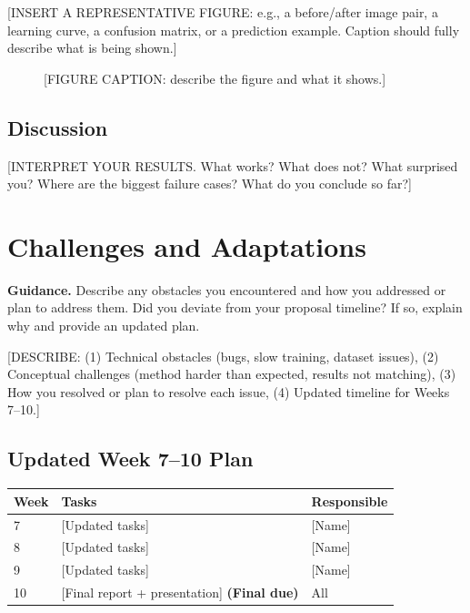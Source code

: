 \documentclass[11pt, letterpaper]{article}
\begin{document}
[INSERT A REPRESENTATIVE FIGURE: e.g., a before/after image pair, a learning
curve, a confusion matrix, or a prediction example. Caption should fully
describe what is being shown.]

\begin{figure}[h]
  \centering
  \caption{[FIGURE CAPTION: describe the figure and what it shows.]}
  \label{fig:qual}
\end{figure}

\subsection{Discussion}

[INTERPRET YOUR RESULTS. What works? What does not? What surprised you?
Where are the biggest failure cases? What do you conclude so far?]

\section{Challenges and Adaptations}

\begin{guidancebox}
\textbf{Guidance.} Describe any obstacles you encountered and how you
addressed or plan to address them. Did you deviate from your proposal timeline?
If so, explain why and provide an updated plan.
\end{guidancebox}

[DESCRIBE: (1) Technical obstacles (bugs, slow training, dataset issues),
(2) Conceptual challenges (method harder than expected, results not matching),
(3) How you resolved or plan to resolve each issue,
(4) Updated timeline for Weeks 7--10.]

\subsection{Updated Week 7--10 Plan}

\begin{tabular}{lp{8cm}l}
\toprule
\textbf{Week} & \textbf{Tasks} & \textbf{Responsible} \\
\midrule
7 & [Updated tasks] & [Name] \\
8 & [Updated tasks] & [Name] \\
9 & [Updated tasks] & [Name] \\
10 & [Final report + presentation] \textbf{(Final due)} & All \\
\bottomrule
\end{tabular}
\end{document}

